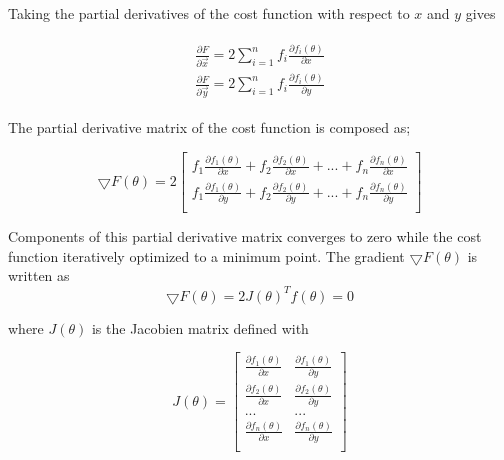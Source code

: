 Taking the partial derivatives of the cost function with respect to $x$ and $y$ gives 

\begin{align}
\begin{split}
\frac{\partial{F}}{\partial{\vec{x}}} = 2\sum_{i=1}^{n}f_i\frac{\partial{f_i(\theta)}}{\partial{x}} \\
\frac{\partial{F}}{\partial{\vec{y}}} = 2\sum_{i=1}^{n}f_i\frac{\partial{f_i(\theta)}}{\partial{y}}
\end{split}
\end{align}

The partial derivative matrix of the cost function is composed as;

\begin{equation}
\bigtriangledown{F(\theta)} = 2 
\begin{bmatrix}
f_1\frac{\partial{f_1(\theta)}}{\partial{x}} + f_2\frac{\partial{f_2(\theta)}}{\partial{x}} + ... + f_n\frac{\partial{f_n(\theta)}}{\partial{x}} \\
f_1\frac{\partial{f_1(\theta)}}{\partial{y}} + f_2\frac{\partial{f_2(\theta)}}{\partial{y}} + ... + f_n\frac{\partial{f_n(\theta)}}{\partial{y}} \\
\end{bmatrix}
\end{equation}	
	
Components of this partial derivative matrix converges to zero while the cost function iteratively optimized to a minimum point. The gradient $\bigtriangledown{F(\theta)}$ is written as
\begin{equation} \label{minimize_mi}
\bigtriangledown{F(\theta)} = 2J(\theta)^Tf(\theta) = 0
\end{equation}

where $J(\theta)$ is the Jacobien matrix defined with

\begin{equation}
J(\theta) = \begin{bmatrix}
\frac{\partial{f_1(\theta)}}{\partial{x}} & \frac{\partial{f_1(\theta)}}{\partial{y}} \\
\frac{\partial{f_2(\theta)}}{\partial{x}} & \frac{\partial{f_2(\theta)}}{\partial{y}} \\
... & ... \\
\frac{\partial{f_n(\theta)}}{\partial{x}} & \frac{\partial{f_n(\theta)}}{\partial{y}} \\
\end{bmatrix}
\end{equation}

